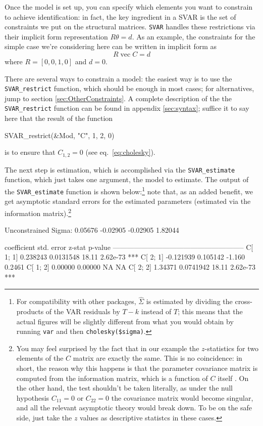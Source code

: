 \documentclass[a4paper,10pt]{article}
\newcounter{script}[section]
\DeclareMathOperator{\VEC}{\mathrm{vec}}
\begin{document}
Once the model is set up, you can specify which elements you want to
constrain to achieve identification: in fact, the key ingredient in a
SVAR is the set of constraints we put on the structural
matrices. \texttt{SVAR} handles these restrictions via their implicit
form representation $R \theta = d$.  As an example, the constraints
for the simple case we're considering here can be written in implicit
form as
\[
  R \VEC C = d
\]
where $R = \left[ 0, 0, 1, 0 \right]$ and $d=0$.

There are several ways to constrain a model: the easiest way is to use
the \texttt{SVAR\_restrict} function, which should be enough in most
cases; for alternatives, jump to section \ref{sec:OtherConstraints}. A
complete description of the the \texttt{SVAR\_restrict} function can
be found in appendix \ref{sec:syntax}; suffice it to say here that the
result of the function
\begin{code}
  SVAR_restrict(&Mod, "C", 1, 2, 0)
\end{code}
is to ensure that $C_{1,2} = 0$ (see eq.~\ref{eq:cholesky}). 

The next step is estimation, which is accomplished via the
\texttt{SVAR\_estimate} function, which just takes one argument, the
model to estimate. The output of the \texttt{SVAR\_estimate} function
is shown below:\footnote{For compatibility with other packages,
  $\hat{\Sigma}$ is estimated by dividing the cross-products of the
  VAR residuals by $T-k$ instead of $T$; this means that the actual
  figures will be slightly different from what you would obtain by
  running \texttt{var} and then \texttt{cholesky(\$sigma)}.} note
that, as an added benefit, we get asymptotic standard errors for the
estimated parameters (estimated via the information
matrix).\footnote{You may feel surprised by the fact that in our
  example the $z$-statistics for two elements of the $C$ matrix are
  exactly the same. This is no coincidence: in short, the reason why
  this happens is that the parameter covariance matrix is computed
  from the information matrix, which is a function of $C$ itself
  \citep[see][for more details]{AG}. On the other hand, the test
  shouldn't be taken literally, as under the null hypothesis
  $C_{11} = 0$ or $C_{22} = 0$ the covariance matrix would become
  singular, and all the relevant asymptotic theory would break
  down. To be on the safe side, just take the $z$ values as
  descriptive statistcs in these cases.}

\begin{code}
Unconstrained Sigma:
     0.05676    -0.02905
    -0.02905     1.82044

             coefficient   std. error   z-stat    p-value 
  --------------------------------------------------------
  C[ 1; 1]     0.238243    0.0131548    18.11     2.62e-73 ***
  C[ 2; 1]    -0.121939    0.105142     -1.160    0.2461  
  C[ 1; 2]     0.00000     0.00000      NA       NA       
  C[ 2; 2]     1.34371     0.0741942    18.11     2.62e-73 ***
\end{code}
\end{document}
